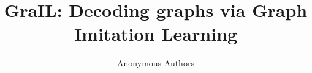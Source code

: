 \documentclass[12pt]{article}
\begin{document}
    \title{GraIL: Decoding graphs via Graph Imitation Learning}
    \author{Anonymous Authors}
    \maketitle

    
    
    
    
    

    \printbibliography
\end{document}
